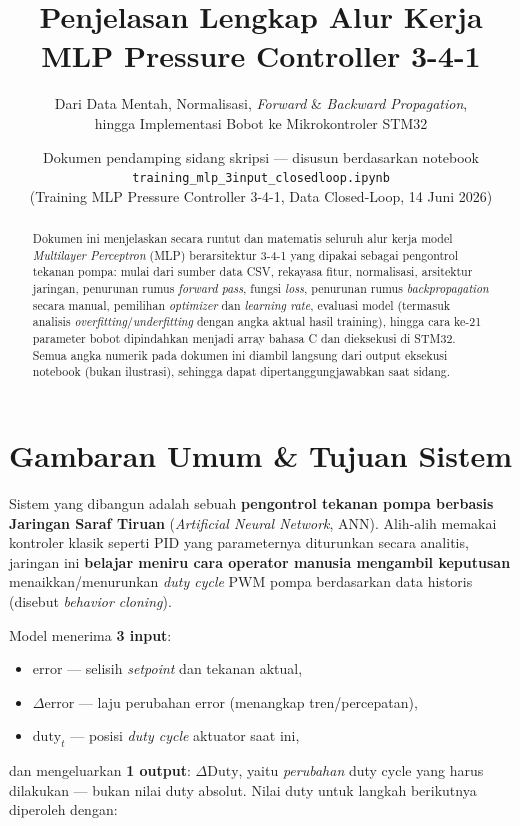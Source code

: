 \documentclass[11pt,a4paper]{article}
\title{\color{navy}\textbf{Penjelasan Lengkap Alur Kerja\\MLP Pressure Controller 3-4-1}}
\author{\large Dari Data Mentah, Normalisasi, \emph{Forward} \& \emph{Backward Propagation},\\
hingga Implementasi Bobot ke Mikrokontroler STM32}
\date{Dokumen pendamping sidang skripsi --- disusun berdasarkan notebook\\
\texttt{training\_mlp\_3input\_closedloop.ipynb}\\
(Training MLP Pressure Controller 3-4-1, Data Closed-Loop, 14 Juni 2026)}
\begin{document}
\maketitle

\begin{abstract}
\noindent Dokumen ini menjelaskan secara runtut dan matematis seluruh alur kerja model
\emph{Multilayer Perceptron} (MLP) berarsitektur 3-4-1 yang dipakai sebagai pengontrol
tekanan pompa: mulai dari sumber data CSV, rekayasa fitur, normalisasi, arsitektur
jaringan, penurunan rumus \emph{forward pass}, fungsi \emph{loss}, penurunan rumus
\emph{backpropagation} secara manual, pemilihan \emph{optimizer} dan \emph{learning rate},
evaluasi model (termasuk analisis \emph{overfitting}/\emph{underfitting} dengan angka aktual
hasil training), hingga cara ke-21 parameter bobot dipindahkan menjadi array bahasa C dan
dieksekusi di STM32. Semua angka numerik pada dokumen ini diambil langsung dari output
eksekusi notebook (bukan ilustrasi), sehingga dapat dipertanggungjawabkan saat sidang.
\end{abstract}

\tableofcontents
\newpage

\section{Gambaran Umum \& Tujuan Sistem}

Sistem yang dibangun adalah sebuah \textbf{pengontrol tekanan pompa berbasis Jaringan
Saraf Tiruan} (\emph{Artificial Neural Network}, ANN). Alih-alih memakai kontroler klasik
seperti PID yang parameternya diturunkan secara analitis, jaringan ini \textbf{belajar
meniru cara operator manusia mengambil keputusan} menaikkan/menurunkan \emph{duty cycle}
PWM pompa berdasarkan data historis (disebut \emph{behavior cloning}).

Model menerima \textbf{3 input}:
\begin{itemize}[nosep]
  \item $\mathrm{error}$ --- selisih \emph{setpoint} dan tekanan aktual,
  \item $\Delta\mathrm{error}$ --- laju perubahan error (menangkap tren/percepatan),
  \item $\mathrm{duty}_t$ --- posisi \emph{duty cycle} aktuator saat ini,
\end{itemize}
dan mengeluarkan \textbf{1 output}: $\Delta\mathrm{Duty}$, yaitu \emph{perubahan} duty
cycle yang harus dilakukan --- bukan nilai duty absolut. Nilai duty untuk langkah
berikutnya diperoleh dengan:
\end{document}
